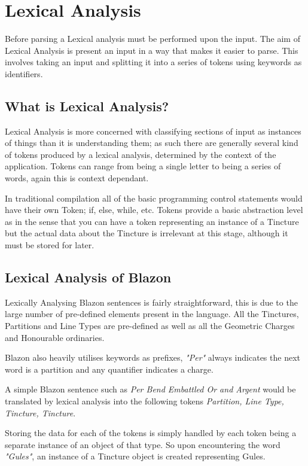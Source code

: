 \chapter{Lexical Analysis} 


Before parsing a Lexical analysis must be performed upon the input. The aim of Lexical Analysis is present an input in a way that makes it easier to parse.  This involves taking an input and splitting it into a series of tokens using keywords as identifiers.


\section{What is Lexical Analysis?}
Lexical Analysis is more concerned with classifying sections of input as instances of things than it is understanding them; as such there are generally several kind of tokens produced by a lexical analysis, determined by the context of the application.  Tokens can range from being a single letter to being a series of words, again this is context dependant.

In traditional compilation all of the basic programming control statements would have their own Token; if, else, while, etc.  Tokens provide a basic abstraction level as in the sense that you can have a token representing an instance of a Tincture but the actual data about the Tincture is irrelevant at this stage, although it must be stored for later. 

\section{Lexical Analysis of Blazon} 

Lexically Analysing Blazon sentences is fairly straightforward, this is due to the large number of pre-defined elements present in the language.  All the Tinctures, Partitions and Line Types are pre-defined as well as all the Geometric Charges and Honourable ordinaries.  

Blazon also heavily utilises keywords as prefixes, \emph{"Per"} always indicates the next word is a partition and any quantifier indicates a charge.  


A simple Blazon sentence such as \emph{Per Bend Embattled Or and Argent} would be translated by lexical analysis into the following tokens \emph{Partition, Line Type,  Tincture, Tincture}. 

Storing the data for each of the tokens is simply handled by each token being a separate instance of an object of that type. So upon encountering the word \emph{"Gules"}, an instance of a Tincture object is created representing Gules. 

